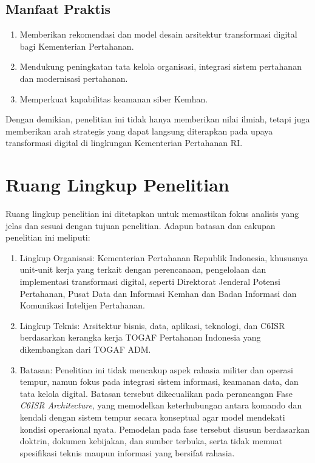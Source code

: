 \subsection{Manfaat Praktis}
\begin{enumerate}
    \item Memberikan rekomendasi dan model desain arsitektur transformasi digital bagi Kementerian Pertahanan.
    \item Mendukung peningkatan tata kelola organisasi, integrasi sistem pertahanan dan modernisasi pertahanan.
    \item Memperkuat kapabilitas keamanan siber Kemhan.
\end{enumerate}
Dengan demikian, penelitian ini tidak hanya memberikan nilai ilmiah, tetapi juga memberikan arah strategis yang dapat langsung diterapkan
pada upaya transformasi digital di lingkungan Kementerian Pertahanan RI.

\section{Ruang Lingkup Penelitian}
Ruang lingkup penelitian ini ditetapkan untuk memastikan fokus analisis yang jelas dan sesuai dengan tujuan penelitian.
Adapun batasan dan cakupan penelitian ini meliputi:
\begin{enumerate}
    \item Lingkup Organisasi: Kementerian Pertahanan Republik Indonesia, khususnya unit-unit kerja yang terkait dengan perencanaan,
    pengelolaan dan implementasi transformasi digital, seperti Direktorat Jenderal Potensi Pertahanan, Pusat Data dan Informasi Kemhan dan Badan Informasi dan Komunikasi Intelijen Pertahanan.
    \item Lingkup Teknis: Arsitektur bisnis, data, aplikasi, teknologi, dan C6ISR berdasarkan kerangka kerja TOGAF Pertahanan Indonesia yang dikembangkan dari TOGAF ADM.
    \item Batasan: Penelitian ini tidak mencakup aspek rahasia militer dan operasi tempur, namun fokus pada integrasi sistem informasi, keamanan data, dan tata kelola digital.
    Batasan tersebut dikecualikan pada perancangan Fase \textit{C6ISR Architecture}, yang memodelkan keterhubungan antara komando dan kendali dengan sistem tempur secara konseptual agar model mendekati kondisi operasional nyata.
    Pemodelan pada fase tersebut disusun berdasarkan doktrin, dokumen kebijakan, dan sumber terbuka, serta tidak memuat spesifikasi teknis maupun informasi yang bersifat rahasia.
\end{enumerate}

